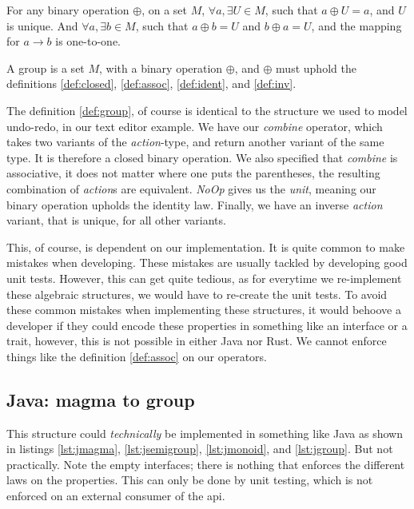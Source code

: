 \begin{definition} \label{def:inv}
  For any binary operation $\oplus$, on a set $M$,
  $\forall a, \exists U \in M$, such that
  $a \oplus U = a$, and $U$ is unique.
  And $\forall a, \exists b \in M$, such that $a \oplus b = U$ and
  $b \oplus a = U$, and the mapping for $a \to b$ is one-to-one.
\end{definition}

\begin{definition}[Group] \label{def:group}
  A group is a set $M$, with a binary operation $\oplus$, and $\oplus$ must
  uphold the definitions \ref{def:closed}, \ref{def:assoc}, \ref{def:ident},
  and \ref{def:inv}.
\end{definition}

The definition \ref{def:group}, of course is identical to the structure we used
to model undo-redo, in our text editor example. We have our \textit{combine}
operator, which takes two variants of the \textit{action}-type, and return
another variant of the same type. It is therefore a closed binary operation. We
also specified that \textit{combine} is associative, it does not matter where one
puts the parentheses, the resulting combination of \textit{action}s are
equivalent. \textit{NoOp} gives us the \textit{unit}, meaning our binary
operation upholds the identity law. Finally, we have an inverse \textit{action}
variant, that is unique, for all other variants.

This, of course, is dependent on our implementation. It is quite common to make
mistakes when developing. These mistakes are usually tackled by developing good
unit tests. However, this can get quite tedious, as for everytime we re-implement
these algebraic structures, we would have to re-create the unit tests. To avoid
these common mistakes when implementing these structures, it would behoove a
developer if they could encode these properties in something like an interface or
a trait, however, this is not possible in either Java nor Rust. We cannot enforce
things like the definition \ref{def:assoc} on our operators.

\subsection{Java: magma to group}

This structure could \textit{technically} be implemented in something like Java
as shown in listings \ref{lst:jmagma}, \ref{lst:jsemigroup}, \ref{lst:jmonoid},
and \ref{lst:jgroup}. But not practically. Note the empty interfaces; there is
nothing that enforces the different laws on the properties. This can only be
done by unit testing, which is not enforced on an external consumer of the
\gls*{api}.

